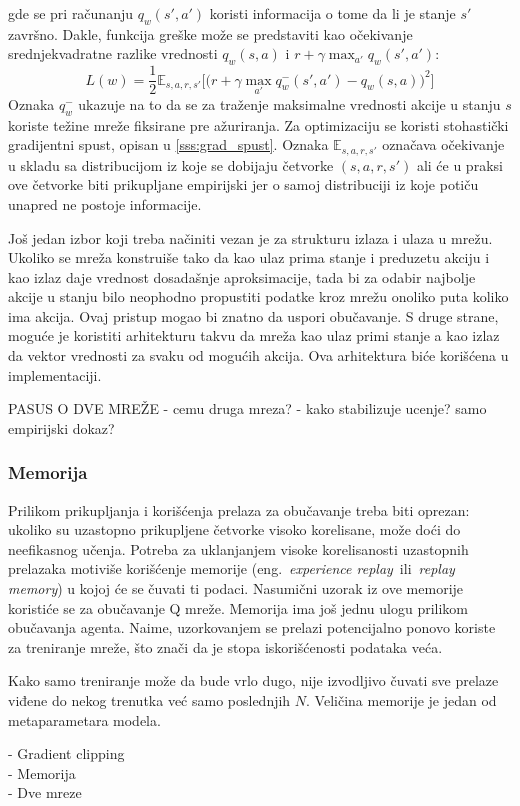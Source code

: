 gde se pri računanju $q_w(s',a')$ koristi informacija o tome da li je stanje $s'$ završno. Dakle, funkcija greške može se predstaviti kao očekivanje srednjekvadratne razlike vrednosti $q_w(s,a)$ i $r + \gamma \max_{a'}q_w(s',a')$:
\begin{equation}
	L(w) = \frac{1}{2}\mathbb{E}_{s,a,r,s'}\bigg[ \big(r + \gamma \max_{a'}q_w^-(s',a') - q_w(s,a)\big) ^2 \bigg]
\end{equation}
Oznaka $q_w^-$ ukazuje na to da se za traženje maksimalne vrednosti akcije u stanju $s$ koriste težine mreže fiksirane pre ažuriranja. Za optimizaciju se koristi stohastički gradijentni spust, opisan u \ref{sss:grad_spust}. Oznaka $\mathbb{E}_{s,a,r,s'}$ označava očekivanje u skladu sa distribucijom iz koje se dobijaju četvorke $(s,a,r,s')$ ali će u praksi ove četvorke biti prikupljane empirijski jer o samoj distribuciji iz koje potiču unapred ne postoje informacije. 
\par 
Još jedan izbor koji treba načiniti vezan je za strukturu izlaza i ulaza u mrežu. Ukoliko se mreža konstruiše tako da kao ulaz prima stanje i preduzetu akciju i kao izlaz daje vrednost dosadašnje aproksimacije, tada bi za odabir najbolje akcije u stanju bilo neophodno propustiti podatke kroz mrežu onoliko puta koliko ima akcija. Ovaj pristup mogao bi znatno da uspori obučavanje. S druge strane, moguće je koristiti arhitekturu takvu da mreža kao ulaz primi stanje a kao izlaz da vektor vrednosti za svaku od mogućih akcija. Ova arhitektura biće korišćena u implementaciji.
\par 
PASUS O DVE MREŽE
	- cemu druga mreza? 
	- kako stabilizuje ucenje? samo empirijski dokaz?
\subsubsection{Memorija}
Prilikom prikupljanja i korišćenja prelaza za obučavanje treba biti oprezan: ukoliko su uzastopno prikupljene četvorke visoko korelisane, može doći do neefikasnog učenja. Potreba za uklanjanjem visoke korelisanosti uzastopnih prelazaka motiviše korišćenje memorije (eng.~{\em experience replay}~ili~{\em replay memory}) u kojoj će se čuvati ti podaci. Nasumični uzorak iz ove memorije koristiće se za obučavanje Q mreže. Memorija ima još jednu ulogu prilikom obučavanja agenta. Naime, uzorkovanjem se prelazi potencijalno ponovo koriste za treniranje mreže, što znači da je stopa iskorišćenosti podataka veća. 
\par 
Kako samo treniranje može da bude vrlo dugo, nije izvodljivo čuvati sve prelaze viđene do nekog trenutka već samo poslednjih $N$. Veličina memorije je jedan od metaparametara modela.

\par 
- Gradient clipping \\
- Memorija\\
- Dve mreze\\

